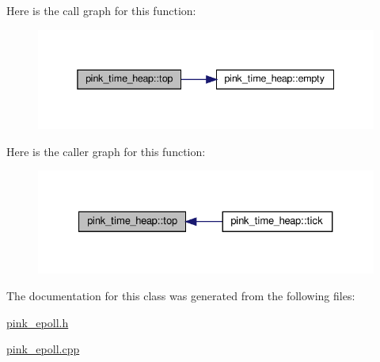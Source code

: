 Here is the call graph for this function\+:\nopagebreak
\begin{figure}[H]
\begin{center}
\leavevmode
\includegraphics[width=338pt]{classpink__time__heap_ac0932b13390241373290a321ecf16600_cgraph}
\end{center}
\end{figure}
Here is the caller graph for this function\+:\nopagebreak
\begin{figure}[H]
\begin{center}
\leavevmode
\includegraphics[width=327pt]{classpink__time__heap_ac0932b13390241373290a321ecf16600_icgraph}
\end{center}
\end{figure}


The documentation for this class was generated from the following files\+:\begin{DoxyCompactItemize}
\item 
\hyperlink{pink__epoll_8h}{pink\+\_\+epoll.\+h}\item 
\hyperlink{pink__epoll_8cpp}{pink\+\_\+epoll.\+cpp}\end{DoxyCompactItemize}
